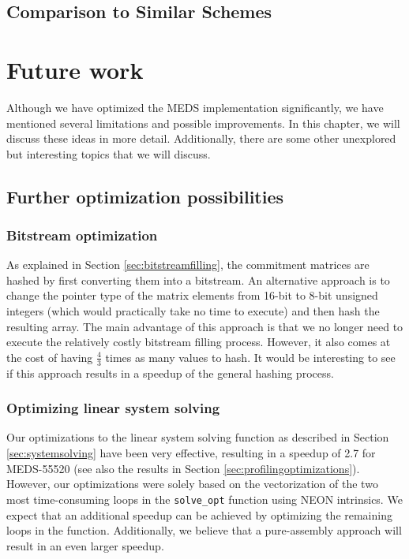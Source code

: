 \documentclass[11pt,a4paper]{report}
\theoremstyle{definition}
\begin{document}
\section{Comparison to Similar Schemes}

\chapter{Future work}
\label{ch:futurework}
Although we have optimized the MEDS implementation significantly, we have mentioned several limitations and possible improvements. In this chapter, we will discuss these ideas in more detail. Additionally, there are some other unexplored but interesting topics that we will discuss.

\section{Further optimization possibilities}

\subsection*{Bitstream optimization}
As explained in Section \ref{sec:bitstreamfilling}, the commitment matrices are hashed by first converting them into a bitstream. An alternative approach is to change the pointer type of the matrix elements from 16-bit to 8-bit unsigned integers (which would practically take no time to execute) and then hash the resulting array. The main advantage of this approach is that we no longer need to execute the relatively costly bitstream filling process. However, it also comes at the cost of having $\frac{4}{3}$ times as many values to hash. It would be interesting to see if this approach results in a speedup of the general hashing process.

\subsection*{Optimizing linear system solving}
Our optimizations to the linear system solving function as described in Section \ref{sec:systemsolving} have been very effective, resulting in a speedup of 2.7 for MEDS-55520 (see also the results in Section \ref{sec:profilingoptimizations}). However, our optimizations were solely based on the vectorization of the two most time-consuming loops in the \texttt{solve\_opt} function using NEON intrinsics. We expect that an additional speedup can be achieved by optimizing the remaining loops in the function. Additionally, we believe that a pure-assembly approach will result in an even larger speedup.
\end{document}
